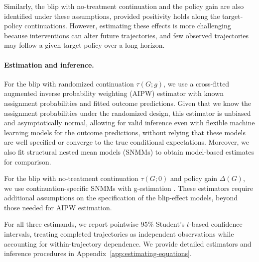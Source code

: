 Similarly, the blip with no-treatment continuation and the policy gain are also identified under these assumptions, provided positivity holds along the target-policy continuations.
However, estimating these effects is more challenging because interventions can alter future trajectories, and few observed trajectories may follow a given target policy over a long horizon.

\paragraph{Estimation and inference.}
For the blip with randomized continuation $\tau(G;g)$, we use a cross-fitted augmented inverse probability weighting (AIPW) estimator with known assignment probabilities and fitted outcome predictions. Given that we know the assignment probabilities under the randomized design, this estimator is unbiased and asymptotically normal, allowing for valid inference even with flexible machine learning models for the outcome predictions, without relying that these models are well specified or converge to the true conditional expectations.
Moreover, we also fit structural nested mean models (SNMMs) to obtain model-based estimates for comparison.

For the blip with no-treatment continuation $\tau(G;0)$ and policy gain $\Delta(G)$, we use continuation-specific SNMMs with g-estimation \citep{robins1994correcting,vansteelandt2014snmm,lewis2020double}.
These estimators require additional assumptions on the specification of the blip-effect models, beyond those needed for AIPW estimation.

For all three estimands, we report pointwise 95\% Student's $t$-based confidence intervals, treating completed trajectories as independent observations while accounting for within-trajectory dependence.
We provide detailed estimators and inference procedures in Appendix~\ref {app:estimating-equations}.